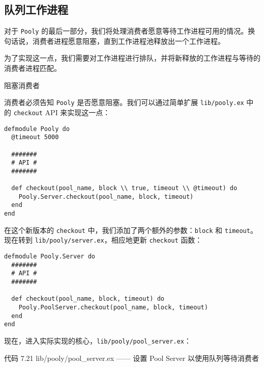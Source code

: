 \subsection{队列工作进程}

对于 \texttt{Pooly}
的最后一部分，我们将处理消费者愿意等待工作进程可用的情况。换句话说，消费者进程愿意阻塞，直到工作进程池释放出一个工作进程。

为了实现这一点，我们需要对工作进程进行排队，并将新释放的工作进程与等待的消费者进程匹配。

阻塞消费者

消费者必须告知 \texttt{Pooly}
是否愿意阻塞。我们可以通过简单扩展
\texttt{lib/pooly.ex} 中的
\texttt{checkout} API 来实现这一点：

\begin{code}{}
\begin{verbatim}
defmodule Pooly do
  @timeout 5000

  ####### 
  # API #
  #######

  def checkout(pool_name, block \\ true, timeout \\ @timeout) do
    Pooly.Server.checkout(pool_name, block, timeout)
  end
end
\end{verbatim}
\end{code}

在这个新版本的 \texttt{checkout}
中，我们添加了两个额外的参数：\texttt{block} 和
\texttt{timeout}。现在转到
\texttt{lib/pooly/server.ex}，相应地更新
\texttt{checkout} 函数：

\begin{code}{}
\begin{verbatim}
defmodule Pooly.Server do
  #######
  # API #
  #######

  def checkout(pool_name, block, timeout) do
    Pooly.PoolServer.checkout(pool_name, block, timeout)
  end
end
\end{verbatim}
\end{code}

现在，进入实际实现的核心，\texttt{lib/pooly/pool\_server.ex}：

代码 7.21 lib/pooly/pool\_server.ex ------ 设置 Pool Server
以使用队列等待消费者

